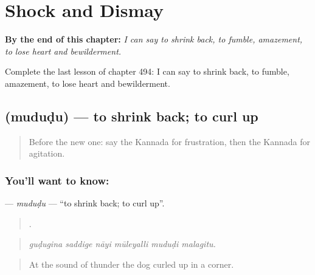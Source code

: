 
\chapter{Shock and Dismay}
\label{ch:ka-shock-and-dismay}

\begin{chapteropening}
\textbf{By the end of this chapter:} \emph{I can say to shrink back, to fumble, amazement, to lose heart and bewilderment.}

Complete the last lesson of chapter 494: I can say to shrink back, to fumble, amazement, to lose heart and bewilderment.
\end{chapteropening}

\section[\texorpdfstring{\kn{ಮುದುಡು} (muduḍu)}{ಮುದುಡು (muduḍu)}]{ (muduḍu) — to shrink back; to curl up}

\label{lesson:KA-C494-mududu}



\begin{quote}
Before the new one: say the Kannada for frustration, then the Kannada for agitation.
\end{quote}

\subsection*{You'll want to know: }
\textbf{} — \emph{muduḍu} — \textquotedblleft{}to shrink back; to curl up\textquotedblright{}.

\begin{quote}
     .
\end{quote}

\begin{quote}
\emph{guḍugina saddige nāyi mūleyalli muduḍi malagitu.}
\end{quote}

\begin{quote}
At the sound of thunder the dog curled up in a corner.
\end{quote}


